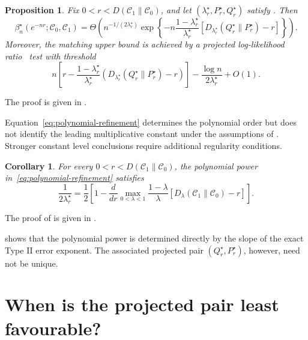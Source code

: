 \documentclass[journal,10pt,draftclsnofoot,onecolumn]{IEEEtran}
\newtheorem{corollary}{Corollary}
\newtheorem{proposition}{Proposition}
\begin{document}
\begin{proposition}
\label{prop:polynomial-refinement}
Fix $0<r<D(\mathcal C_1\|\mathcal C_0)$, and let $(\lambda_r^\star,P_r^\star,Q_r^\star)$ satisfy . Then
\begin{equation}
\beta_n^\star(e^{-nr};\mathcal C_0,\mathcal C_1) =\Theta\!\left(n^{-1/(2\lambda_r^\star)}\exp\left\{-n\frac{1-\lambda_r^\star}{\lambda_r^\star}\left[D_{\lambda_r^\star}(Q_r^\star\|P_r^\star)-r\right]\right\}\right).
\label{eq:polynomial-refinement}
\end{equation}
Moreover, the matching upper bound is achieved by a projected log-likelihood ratio~ test with threshold
\begin{equation*}
n\left[r-\frac{1-\lambda_r^\star}{\lambda_r^\star}\left(D_{\lambda_r^\star}(Q_r^\star\|P_r^\star)-r\right)\right]-\frac{\log n}{2\lambda_r^\star}+O(1).
\end{equation*}
\end{proposition}
The proof is given in .

Equation~\eqref{eq:polynomial-refinement} determines the polynomial order but does not identify the leading multiplicative constant under the assumptions of . Stronger constant level conclusions require additional regularity conditions.

\begin{corollary}
\label{cor:polynomial-slope}
For every $0<r<D(\mathcal C_1\|\mathcal C_0)$, the polynomial power in~\eqref{eq:polynomial-refinement} satisfies
\begin{equation}
\frac{1}{2\lambda_r^\star}=\frac{1}{2}\left[1-\frac{d}{dr}\max_{0<\lambda<1}\frac{1-\lambda}{\lambda}\left[D_\lambda(\mathcal C_1\|\mathcal C_0)-r\right]\right].
\label{eq:hoeffding-tangent-polynomial}
\end{equation}
\end{corollary}
The proof of  is given in
.

 shows that the polynomial power is determined directly by the slope of the exact Type II error exponent. The associated projected pair $(Q_r^\star,P_r^\star)$, however, need not be unique.

\section{When is the projected pair least favourable?}
\label{sec:exact-reduction}
\end{document}
